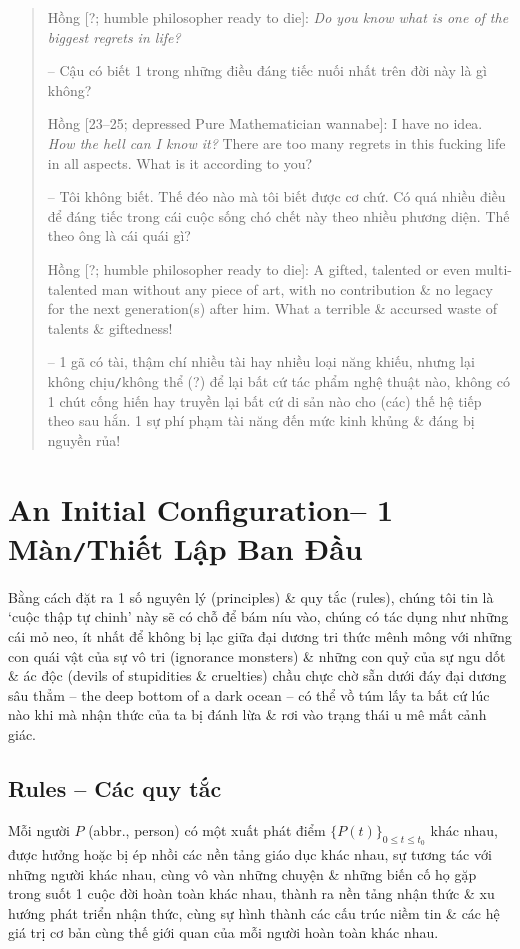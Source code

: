 \documentclass[12pt]{article}
\begin{document}
\begin{quote}
	{\sf Hồng [?; humble philosopher ready to die]}: {\it Do you know what is one of the biggest regrets in life?}
	
	-- Cậu có biết 1 trong những điều đáng tiếc nuối nhất trên đời này là gì không?
	
	{\sf Hồng [23--25; depressed Pure Mathematician wannabe]}: I have no idea. {\it How the hell can I know it?} There are too many regrets in this fucking life in all aspects. What is it according to you?
	
	-- Tôi không biết. Thế đéo nào mà tôi biết được cơ chứ. Có quá nhiều điều để đáng tiếc trong cái cuộc sống chó chết này theo nhiều phương diện. Thế theo ông là cái quái gì?
	
	{\sf Hồng [?; humble philosopher ready to die]}: A gifted, talented or even multi-talented man without any piece of art, with no contribution \& no legacy for the next generation(s) after him. What a terrible \& accursed waste of talents \& giftedness!
	
	-- 1 gã có tài, thậm chí nhiều tài hay nhiều loại năng khiếu, nhưng lại không chịu{\tt/}không thể (?) để lại bất cứ tác phẩm nghệ thuật nào, không có 1 chút cống hiến hay truyền lại bất cứ di sản nào cho (các) thế hệ tiếp theo sau hắn. 1 sự phí phạm tài năng đến mức kinh khủng \& đáng bị nguyền rủa!
\end{quote}

\section{An Initial Configuration-- 1 Màn{\tt/}Thiết Lập Ban Đầu}
Bằng cách đặt ra 1 số nguyên lý (principles) \& quy tắc (rules), chúng tôi tin là `cuộc thập tự chinh' này sẽ có chỗ để bám níu vào, chúng có tác dụng như những cái mỏ neo, ít nhất để không bị lạc giữa đại dương tri thức mênh mông với những con quái vật của sự vô tri (ignorance monsters) \& những con quỷ của sự ngu dốt \& ác độc (devils of stupidities \& cruelties) chầu chực chờ sẵn dưới đáy đại dương sâu thẳm -- the deep bottom of a dark ocean -- có thể vồ túm lấy ta bất cứ lúc nào khi mà nhận thức của ta bị đánh lừa \& rơi vào trạng thái u mê mất cảnh giác.

\subsection{Rules -- Các quy tắc}
Mỗi người $P$ (abbr., person) có một xuất phát điểm $\{P(t)\}_{0\le t\le t_0}$ khác nhau, được hưởng hoặc bị ép nhồi các nền tảng giáo dục khác nhau, sự tương tác với những người khác nhau, cùng vô vàn những chuyện \& những biến cố họ gặp trong suốt 1 cuộc đời hoàn toàn khác nhau, thành ra nền tảng nhận thức \& xu hướng phát triển nhận thức, cùng sự hình thành các cấu trúc niềm tin \& các hệ giá trị cơ bản cùng thế giới quan của mỗi người hoàn toàn khác nhau.
\end{document}
